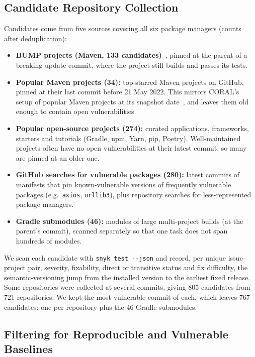 \documentclass[11pt]{article}
\theoremstyle{definition}
\begin{document}
\subsection{Candidate Repository Collection}
\label{sec:sources}

Candidates come from five sources covering all six package managers (counts after deduplication):
\begin{itemize}
  \item \textbf{BUMP projects (Maven, 133 candidates)}~\cite{reyes2024bump}, pinned at the parent of a breaking-update commit, where the project still builds and passes its tests.
  \item \textbf{Popular Maven projects (34):} top-starred Maven projects on GitHub, pinned at their last commit before 21 May 2022. This mirrors CORAL's setup of popular Maven projects at its snapshot date~\cite{zhang2023coral}, and leaves them old enough to contain open vulnerabilities.
  \item \textbf{Popular open-source projects (274):} curated applications, frameworks, starters and tutorials (Gradle, npm, Yarn, pip, Poetry). Well-maintained projects often have no open vulnerabilities at their latest commit, so many are pinned at an older one.
  \item \textbf{GitHub searches for vulnerable packages (280):} latest commits of manifests that pin known-vulnerable versions of frequently vulnerable packages (e.g.\ \texttt{axios}, \texttt{urllib3}), plus repository searches for less-represented package managers.
  \item \textbf{Gradle submodules (46):} modules of large multi-project builds (at the parent's commit), scanned separately so that one task does not span hundreds of modules.
\end{itemize}

We scan each candidate with \texttt{snyk test -{}-json} and record, per unique issue--project pair, severity, fixability, direct or transitive status and fix difficulty, the semantic-versioning jump from the installed version to the earliest fixed release. Some repositories were collected at several commits, giving 805 candidates from 721 repositories. We kept the most vulnerable commit of each, which leaves 767 candidates: one per repository plus the 46 Gradle submodules.

\subsection{Filtering for Reproducible and Vulnerable Baselines}
\label{sec:filtering}
\end{document}
